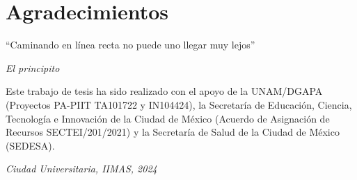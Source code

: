 
\chapter*{Agradecimientos}
\epigraph{``Caminando en línea recta no puede uno llegar muy lejos''
}{\textit{El principito}}
\noindent 


Este trabajo de tesis ha sido realizado con el apoyo de la UNAM/DGAPA (Proyectos PA-PIIT TA101722 y IN104424), la Secretaría de Educación, Ciencia, Tecnología e Innovación de la Ciudad de México (Acuerdo de Asignación de Recursos SECTEI/201/2021) y la Secretaría de Salud de la Ciudad de México (SEDESA).

\begin{flushright}
\textit{Ciudad Universitaria, IIMAS, 2024}
\end{flushright}
 



